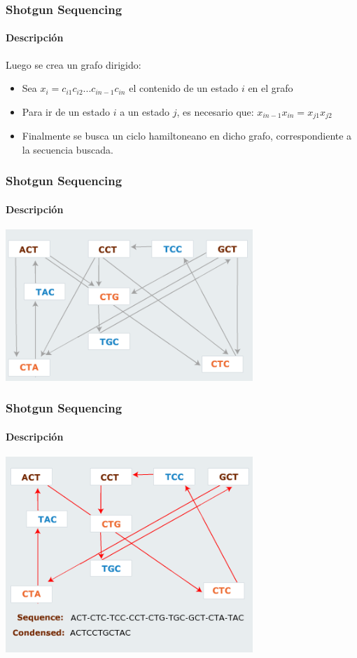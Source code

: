 \frame
{
\frametitle{Shotgun Sequencing}
\framesubtitle{Descripción}

Luego se crea un grafo dirigido:

\begin{itemize}
	\item Sea $x_i = c_{i1} c_{i2} ... c_{in-1} c_{in}$ el contenido de un estado $i$ en el grafo
	\item Para ir de un estado $i$ a un estado $j$, es necesario que: $x_{in-1}x_{in} = x_{j1} x_{j2}$
	\item Finalmente se busca un ciclo hamiltoneano en dicho grafo, correspondiente a la secuencia buscada.
\end{itemize}
}


\frame
{
\frametitle{Shotgun Sequencing}
\framesubtitle{Descripción}

\begin{center}
	\includegraphics[width=0.7\textwidth]{img/tecnica1-5.png}
\end{center}

}

\frame
{
\frametitle{Shotgun Sequencing}
\framesubtitle{Descripción}

\begin{center}
	\includegraphics[width=0.7\textwidth]{img/tecnica1-6.png}
\end{center}
}
